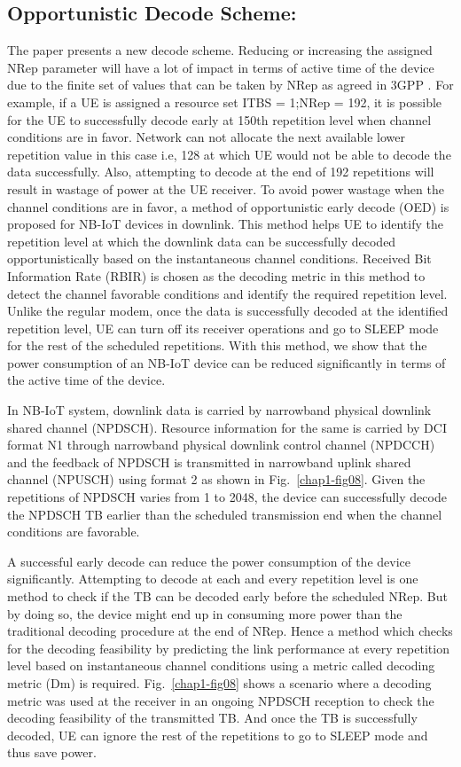 \begin{multicols}{2}
\subsection{Opportunistic Decode Scheme:}

The paper \cite{art1-key28} presents a new decode scheme. Reducing or increasing the assigned NRep parameter will have a lot of impact in terms of active time of the device due to the finite set of values that can be taken by NRep as agreed in 3GPP \cite{art1-key27}. For example, if a UE is assigned a resource set ITBS = 1;NRep = 192, it is possible for the UE to successfully decode early at 150th repetition level when channel conditions are in favor. Network can not allocate the next available lower repetition value in this case i.e, 128 at which UE would not be able to decode the data successfully. Also, attempting to decode at the end of 192 repetitions will result in wastage of power at the UE receiver. To avoid power wastage when the channel conditions are in favor, a method of opportunistic early decode (OED) is proposed for NB-IoT devices in downlink. This method helps UE to identify the repetition level at which the downlink data can be successfully decoded opportunistically based on the instantaneous channel conditions. Received Bit Information Rate (RBIR) is chosen as the decoding metric in this method to detect the channel favorable conditions and identify the required repetition level. Unlike the regular modem, once the data is successfully decoded at the identified repetition level, UE can turn off its receiver operations and go to SLEEP mode for the rest of the scheduled repetitions. With this method, we show that the power consumption of an NB-IoT device can be reduced significantly in terms of the active time of the device. 

In NB-IoT system, downlink data is carried by narrowband physical downlink shared channel (NPDSCH). Resource information for the same is carried by DCI format N1 through narrowband physical downlink control channel (NPDCCH) and the feedback of NPDSCH is transmitted in narrowband uplink shared channel (NPUSCH) using format 2 as shown in Fig.~\ref{chap1-fig08}. Given the repetitions of NPDSCH varies from 1 to 2048, the device can successfully decode the NPDSCH TB earlier than the scheduled transmission end when the channel conditions are favorable.

A successful early decode can reduce the power consumption of the device significantly. Attempting to decode at each and every repetition level is one method to check if the TB can be decoded early before the scheduled NRep. But by doing so, the device might end up in consuming more power than the traditional decoding procedure at the end of NRep. Hence a method which checks for the decoding feasibility by predicting the link performance at every repetition level based on instantaneous channel conditions using a metric called decoding metric (Dm) is required. Fig.~\ref{chap1-fig08} shows a scenario where a decoding metric was used at the receiver in an ongoing NPDSCH reception to check the decoding feasibility of the transmitted TB. And once the TB is successfully decoded, UE can ignore the rest of the repetitions to go to SLEEP mode and thus save power.


\end{multicols}
